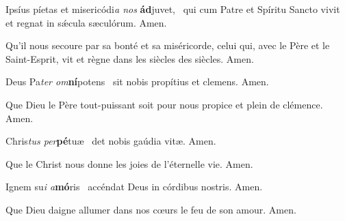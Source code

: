 \documentclass[psautier_nocturne_fr.tex]{subfiles}
\begin{document}



\begin{paracol}{2}

Ipsíus píetas et misericódi\textit{a nos} \textbf{ád}juvet,~\GreSpecial{*}
qui cum Patre et Spíritu Sancto vivit et regnat in sǽcula sæculórum.
\hspace{\specialcharhsep}\rr Amen.

\switchcolumn

Qu'il nous secoure par sa bonté et sa miséricorde, celui qui, avec le Père et le Saint-Esprit, vit et règne dans les siècles des siècles.
\hspace{\specialcharhsep}\rr Amen.

\end{paracol}


\begin{paracol}{2}

 Deus Pa\textit{ter om}\textbf{ní}potens~\GreSpecial{*}
sit nobis propítius et clemens.
\hspace{\specialcharhsep}\rr Amen.

\switchcolumn

Que Dieu le Père tout-puissant soit pour nous propice et plein de clémence.
\hspace{\specialcharhsep}\rr Amen.

\switchcolumn*

 Chris\textit{tus per}\textbf{pé}tuæ~\GreSpecial{*}
det nobis gaúdia vitæ.
\hspace{\specialcharhsep}\rr Amen.

\switchcolumn

Que le Christ nous donne les joies de l'éternelle vie.
\hspace{\specialcharhsep}\rr Amen.

\switchcolumn*

 Ignem su\textit{i a}\textbf{mó}ris~\GreSpecial{*}
accéndat Deus in córdibus nostris.
\hspace{\specialcharhsep}\rr Amen.

\switchcolumn

Que Dieu daigne allumer dans nos cœurs le feu de son amour.
\hspace{\specialcharhsep}\rr Amen.

\end{paracol}
\end{document}
